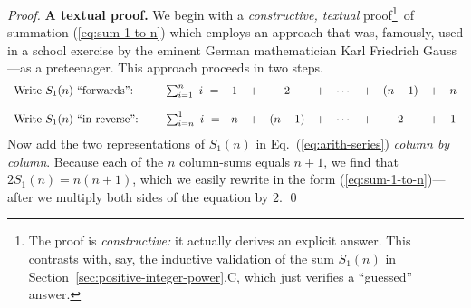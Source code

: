 
 
\begin{proof}
{\bf A textual proof.}
We begin with a {\em constructive, textual} proof\footnote{The proof is {\em constructive:} it actually derives an explicit answer.  This contrasts with, say, the inductive validation of the sum $S_1(n)$ in Section~\ref{sec:positive-integer-power}.C, which just verifies a ``guessed'' answer.}~of summation (\ref{eq:sum-1-to-n}) which employs an approach that was, famously,  used in a school exercise by the eminent German mathematician Karl Friedrich Gauss---as a preteenager.  This approach proceeds in two steps.
\begin{equation}
\label{eq:arith-series}
\begin{array}{llccccccccc}
\mbox{Write $S_1(n)$ ``forwards'':} &
\hspace*{.2in}\sum_{i=1}^n \ i \ = & 1 & + & 2   & + & \cdots & + & (n-1) & + & n \\
 & & & & & & & & & &  \\
\mbox{Write $S_1(n)$ ``in reverse'':} &
\hspace*{.2in}\sum_{i=n}^1 \ i \ = & n & + & (n-1) & + & \cdots & + & 2   & + & 1
\end{array}
\end{equation}
Now add the two representations of $S_1(n)$ in Eq.~(\ref{eq:arith-series}) {\em column by column}.  Because each of the $n$ column-sums equals $n+1$, we find that $2 S_1(n) = n(n+1)$, which we easily rewrite in the form (\ref{eq:sum-1-to-n})---after we multiply both sides of the equation by $2$.  \qed
\end{proof}

\medskip
\noindent {}

